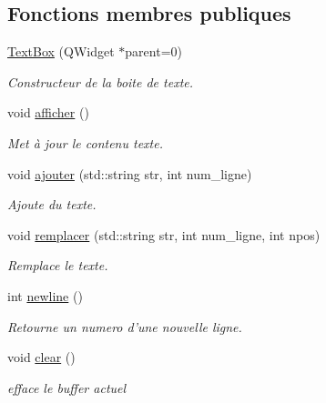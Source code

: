 \subsection*{Fonctions membres publiques}
\begin{DoxyCompactItemize}
\item 
\hyperlink{classTextBox_a8cbbaa2326c8547e180382a58df84243}{Text\+Box} (Q\+Widget $\ast$parent=0)
\begin{DoxyCompactList}\small\item\em Constructeur de la boite de texte. \end{DoxyCompactList}\item 
void \hyperlink{classTextBox_ab124db8fc7720b543a8df13235d6fe96}{afficher} ()
\begin{DoxyCompactList}\small\item\em Met à jour le contenu texte. \end{DoxyCompactList}\item 
void \hyperlink{classTextBox_acca69b10b49ae950a6d2f04c99c7ad80}{ajouter} (std\+::string str, int num\+\_\+ligne)
\begin{DoxyCompactList}\small\item\em Ajoute du texte. \end{DoxyCompactList}\item 
void \hyperlink{classTextBox_a5b4239bff751787a73c0182553822a5f}{remplacer} (std\+::string str, int num\+\_\+ligne, int npos)
\begin{DoxyCompactList}\small\item\em Remplace le texte. \end{DoxyCompactList}\item 
int \hyperlink{classTextBox_a64c57f5a3516613220609a78615df9d0}{newline} ()
\begin{DoxyCompactList}\small\item\em Retourne un numero d'une nouvelle ligne. \end{DoxyCompactList}\item 
\hypertarget{classTextBox_a4c1596312c23884283a8ed1ddc157498}{void \hyperlink{classTextBox_a4c1596312c23884283a8ed1ddc157498}{clear} ()}\label{classTextBox_a4c1596312c23884283a8ed1ddc157498}

\begin{DoxyCompactList}\small\item\em efface le buffer actuel \end{DoxyCompactList}\end{DoxyCompactItemize}


